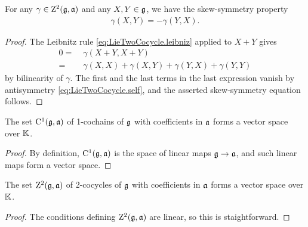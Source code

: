\begin{lemma}
  \label{lem:LieTwoCocycle_skew_symmetry}
  \leanok
  For any $\gamma \in \mathrm{Z}^2(\mathfrak{g},\mathfrak{a})$ and any $X,Y \in \mathfrak{g}$,
  we have the skew-symmetry property
  \begin{align*}
    \gamma(X,Y) = - \gamma(Y,X) .
  \end{align*}
\end{lemma}
\begin{proof}
  \leanok
  The Leibnitz rule \eqref{eq:LieTwoCocycle.leibniz}
  applied to $X+Y$ gives
  \begin{align*}
    0 = \; & \gamma(X+Y,X+Y) \\
      = \; & \gamma(X,X) + \gamma(X,Y) + \gamma(Y,X) + \gamma(Y,Y)
  \end{align*}
  by bilinearity of $\gamma$. The first and the last terms
  in the last expression vanish by antisymmetry \eqref{eq:LieTwoCocycle.self},
  and the asserted skew-symmetry equation follows.
\end{proof}

\begin{lemma}
  \label{lem:LieOneCochain_vectorSpace}
  \leanok
  The set $\mathrm{C}^1(\mathfrak{g}, \mathfrak{a})$ of 1-cochains of $\mathfrak{g}$ with
  coefficients in $\mathfrak{a}$ forms a vector space over $\mathbb{K}$.
\end{lemma}
\begin{proof}
  \leanok
  By definition, $\mathrm{C}^1(\mathfrak{g}, \mathfrak{a})$ is the space of
  linear maps $\mathfrak{g} \to \mathfrak{a}$, and such linear maps form
  a vector space.
\end{proof}

\begin{lemma}
  \label{lem:LieTwoCocycle_vectorSpace}
  \leanok
  The set $\mathrm{Z}^2(\mathfrak{g}, \mathfrak{a})$ of 2-cocycles of $\mathfrak{g}$ with
  coefficients in $\mathfrak{a}$ forms a vector space over $\mathbb{K}$.
\end{lemma}
\begin{proof}
  \leanok
  The conditions defining $\mathrm{Z}^2(\mathfrak{g}, \mathfrak{a})$ are linear,
  so this is staightforward.
\end{proof}

